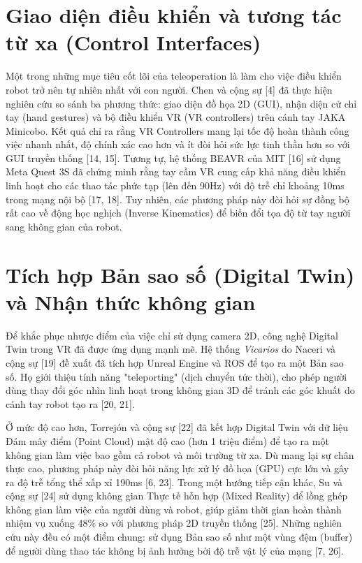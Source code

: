 \section{Giao diện điều khiển và tương tác từ xa (Control Interfaces)}
Một trong những mục tiêu cốt lõi của teleoperation là làm cho việc điều khiển robot trở nên tự nhiên nhất với con người. Chen và cộng sự \cite{chen2023comparing} [4] đã thực hiện nghiên cứu so sánh ba phương thức: giao diện đồ họa 2D (GUI), nhận diện cử chỉ tay (hand gestures) và bộ điều khiển VR (VR controllers) trên cánh tay JAKA Minicobo. Kết quả chỉ ra rằng VR Controllers mang lại tốc độ hoàn thành công việc nhanh nhất, độ chính xác cao hơn và ít đòi hỏi sức lực tinh thần hơn so với GUI truyền thống \cite{chen2023comparing} [14, 15]. Tương tự, hệ thống BEAVR của MIT \cite{arclab2025beavr} [16] sử dụng Meta Quest 3S đã chứng minh rằng tay cầm VR cung cấp khả năng điều khiển linh hoạt cho các thao tác phức tạp (lên đến 90Hz) với độ trễ chỉ khoảng 10ms trong mạng nội bộ \cite{arclab2025beavr} [17, 18]. Tuy nhiên, các phương pháp này đòi hỏi sự đồng bộ rất cao về động học nghịch (Inverse Kinematics) để biến đổi tọa độ từ tay người sang không gian của robot.

\section{Tích hợp Bản sao số (Digital Twin) và Nhận thức không gian}
Để khắc phục nhược điểm của việc chỉ sử dụng camera 2D, công nghệ Digital Twin trong VR đã được ứng dụng mạnh mẽ. Hệ thống \textit{Vicarios} do Naceri và cộng sự \cite{naceri2021vicarios} [19] đề xuất đã tích hợp Unreal Engine và ROS để tạo ra một Bản sao số. Họ giới thiệu tính năng "teleporting" (dịch chuyển tức thời), cho phép người dùng thay đổi góc nhìn linh hoạt trong không gian 3D để tránh các góc khuất do cánh tay robot tạo ra \cite{naceri2021vicarios} [20, 21]. 

Ở mức độ cao hơn, Torrejón và cộng sự \cite{torrejon2026teleoperation} [22] đã kết hợp Digital Twin với dữ liệu Đám mây điểm (Point Cloud) mật độ cao (hơn 1 triệu điểm) để tạo ra một không gian làm việc bao gồm cả robot và môi trường từ xa. Dù mang lại sự chân thực cao, phương pháp này đòi hỏi năng lực xử lý đồ họa (GPU) cực lớn và gây ra độ trễ tổng thể xấp xỉ 190ms \cite{torrejon2026teleoperation} [6, 23]. Trong một hướng tiếp cận khác, Su và cộng sự \cite{su2022mixed} [24] sử dụng không gian Thực tế hỗn hợp (Mixed Reality) để lồng ghép không gian làm việc của người dùng và robot, giúp giảm thời gian hoàn thành nhiệm vụ xuống 48\% so với phương pháp 2D truyền thống \cite{su2022mixed} [25]. Những nghiên cứu này đều có một điểm chung: sử dụng Bản sao số như một vùng đệm (buffer) để người dùng thao tác không bị ảnh hưởng bởi độ trễ vật lý của mạng \cite{autolab2021telesurgery} [7, 26].

